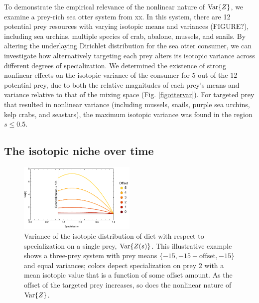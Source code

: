 \documentclass{frontiersSCNS}
\begin{document}
To demonstrate the empirical relevance of the nonlinear nature of ${\rm Var}\{Z\}$, we examine a prey-rich sea otter system from xx.
In this system, there are 12 potential prey resources with varying isotopic means and variances (FIGURE?), including sea urchins, multiple species of crab, abalone, mussels, and snails.
By altering the underlaying Dirichlet distribution for the sea otter consumer, we can investigate how alternatively targeting each prey alters its isotopic variance across different degrees of specialization.
We determined the existence of strong nonlinear effects on the isotopic variance of the consumer for 5 out of the 12 potential prey, due to both the relative magnitudes of each prey's means and variance relative to that of the mixing space (Fig. \ref{figottervar}).
For targeted prey that resulted in nonlinear variance (including mussels, snails, purple sea urchins, kelp crabs, and seastars), the maximum isotopic variance was found in the region $s \leq 0.5$.



\subsection{The isotopic niche over time}















\begin{figure}[h!]
\centering
\includegraphics[width=0.5\textwidth]{fig_var.pdf}
\caption{
Variance of the isotopic distribution of diet with respect to specialization on a single prey, ${\rm Var}\{Z(s)\}$.
This illustrative example shows a three-prey system with prey means $\{-15,-15+\mbox{offset},-15\}$ and equal variances; colors depect specialization on prey 2 with a mean isotopic value that is a function of some offset amount.
As the offset of the targeted prey increases, so does the nonlinear nature of ${\rm Var}\{Z\}$.
}
  \label{figvar}
\end{figure}
\end{document}
